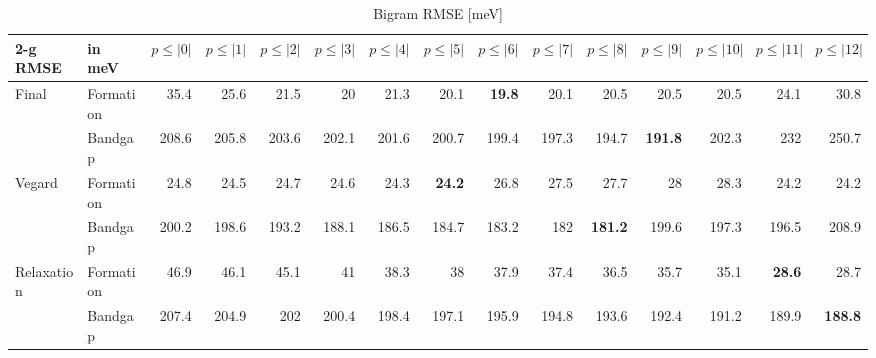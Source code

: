 \documentclass[11pt,oneside,czech,american]{book} %
\theoremstyle{definition} %
\theoremstyle{definition}
\begin{document}
\begin{table}[H]
	\scriptsize	
	\centering
\begin{tabular}{llrrrrrrrrrrrrr}
	\hline
	2-g RMSE   & in meV    &   $p{\leq}|0|$ &   $p{\leq}|1|$ &   $p{\leq}|2|$ &   $p{\leq}|3|$ &   $p{\leq}|4|$ &   $p{\leq}|5|$ &   $p{\leq}|6|$ &   $p{\leq}|7|$ &   $p{\leq}|8|$ &   $p{\leq}|9|$ &   $p{\leq}|10|$ &   $p{\leq}|11|$ &   $p{\leq}|12|$\\
	\hline
	\multirow{2}{*}{Final}      & Formation &       35.4 &       25.6 &       21.5 &       20   &       21.3 &       20.1 &       \textbf{19.8} &       20.1 &       20.5 &       20.5 &        20.5 &        24.1 &        30.8\\
	      & Bandgap   &      208.6 &      205.8 &      203.6 &      202.1 &      201.6 &      200.7 &      199.4 &      197.3 &      194.7 &      \textbf{191.8} &       202.3 &       232   &       250.7\\
	\multirow{2}{*}{Vegard}     & Formation &       24.8 &       24.5 &       24.7 &       24.6 &       24.3 &       \textbf{24.2} &       26.8 &       27.5 &       27.7 &       28   &        28.3 &        24.2 &        24.2\\
	     & Bandgap   &      200.2 &      198.6 &      193.2 &      188.1 &      186.5 &      184.7 &      183.2 &      182   &      \textbf{181.2} &      199.6 &       197.3 &       196.5 &       208.9\\
	\multirow{2}{*}{Relaxation} & Formation &       46.9 &       46.1 &       45.1 &       41   &       38.3 &       38   &       37.9 &       37.4 &       36.5 &       35.7 &        35.1 &        \textbf{28.6} &        28.7\\
	 & Bandgap   &      207.4 &      204.9 &      202   &      200.4 &      198.4 &      197.1 &      195.9 &      194.8 &      193.6 &      192.4 &       191.2 &       189.9 &       \textbf{188.8}\\
	\hline
\end{tabular}
	\caption{Bigram RMSE [meV]}
	\label{2-g RMSE}
\end{table}
\end{document}

